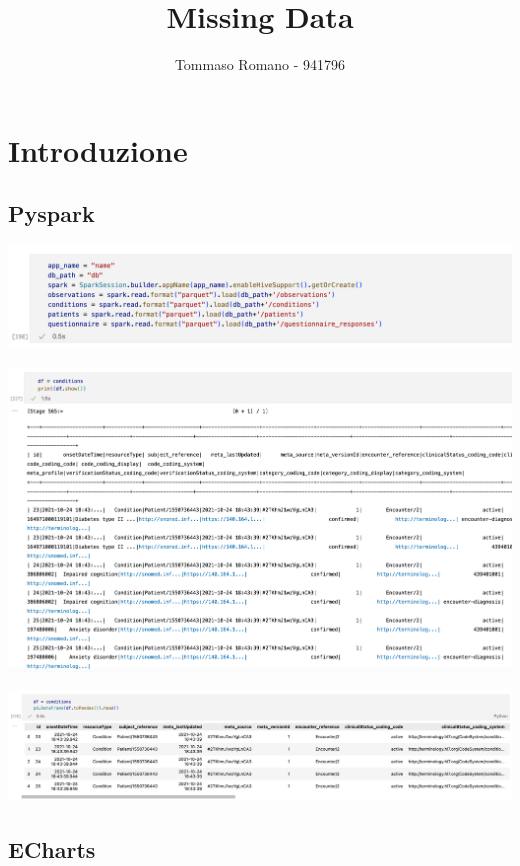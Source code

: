 \documentclass[11pt, oneside]{article}
\title{Missing Data}
\author{Tommaso Romano - 941796}
\begin{document}
\maketitle

\tableofcontents
\pagebreak
\section{Introduzione}

\subsection{Pyspark}

\begin{center}
\includegraphics[scale=0.4]{1_init.png}
\end{center}
\begin{center}
\includegraphics[scale=0.4]{1_spark.png}
\end{center}
\begin{center}
\includegraphics[scale=0.4]{1_pandas.png}
\end{center}


\subsection{ECharts}
\end{document}
